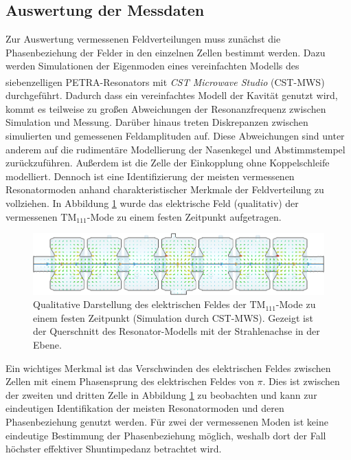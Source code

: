 \subsection{Auswertung der Messdaten}
Zur Auswertung vermessenen Feldverteilungen muss zunächst die Phasenbeziehung der Felder in den einzelnen Zellen bestimmt werden.
Dazu werden Simulationen der Eigenmoden eines vereinfachten Modells des siebenzelligen PETRA-Resonators  mit \textit{CST Microwave Studio\textsuperscript{\textregistered}} (CST-MWS) durchgeführt.
Dadurch dass ein vereinfachtes Modell der Kavität genutzt wird, kommt es teilweise zu großen Abweichungen der Resonanzfrequenz zwischen Simulation und Messung.
Darüber hinaus treten Diskrepanzen zwischen simulierten und gemessenen Feldamplituden auf.
Diese Abweichungen sind unter anderem auf die rudimentäre Modellierung der Nasenkegel und Abstimmstempel zurückzuführen.
Außerdem ist die Zelle der Einkopplung ohne Koppelschleife modelliert.
Dennoch ist eine Identifizierung der meisten vermessenen Resonatormoden anhand charakteristischer Merkmale der Feldverteilung zu vollziehen.
In Abbildung \ref{fig:cst_sim_tm111} wurde das elektrische Feld (qualitativ) der vermessenen $\mathrm{TM}_{111}$-Mode zu einem festen Zeitpunkt aufgetragen. 
\begin{figure}[h]
	\centering
	\includegraphics[width=1.0\textwidth]{./figs/TM111-CST/TM111_cut.png}
	\caption{Qualitative Darstellung des elektrischen Feldes der $\mathrm{TM}_{111}$-Mode zu einem festen Zeitpunkt (Simulation durch CST-MWS). Gezeigt ist der Querschnitt des Resonator-Modells mit der Strahlenachse in der Ebene.}
	\label{fig:cst_sim_tm111}
\end{figure}
Ein wichtiges Merkmal ist das Verschwinden des elektrischen Feldes zwischen Zellen mit einem Phasensprung des elektrischen Feldes von $\pi$.
Dies ist zwischen der zweiten und dritten Zelle in Abbildung \ref{fig:cst_sim_tm111} zu beobachten und kann zur eindeutigen Identifikation der meisten Resonatormoden und deren Phasenbeziehung genutzt werden.
Für zwei der vermessenen Moden ist keine eindeutige Bestimmung der Phasenbeziehung möglich, weshalb dort der Fall höchster effektiver Shuntimpedanz betrachtet wird.

